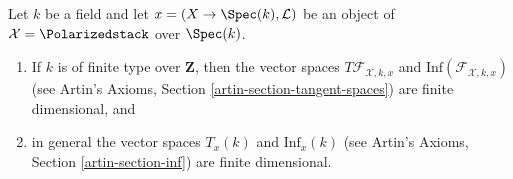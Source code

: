 \begin{lemma}
\label{lemma-polarized-tangent-space}
Let $k$ be a field and let $x = (X \to \Spec(k), \mathcal{L})$
be an object of $\mathcal{X} = \Polarizedstack$ over $\Spec(k)$.
\begin{enumerate}
\item If $k$ is of finite type over $\mathbf{Z}$, then
the vector spaces $T\mathcal{F}_{\mathcal{X}, k, x}$ and
$\text{Inf}(\mathcal{F}_{\mathcal{X}, k, x})$
(see Artin's Axioms, Section \ref{artin-section-tangent-spaces})
are finite dimensional, and
\item in general the vector spaces $T_x(k)$ and $\text{Inf}_x(k)$
(see Artin's Axioms, Section \ref{artin-section-inf})
are finite dimensional.
\end{enumerate}
\end{lemma}

